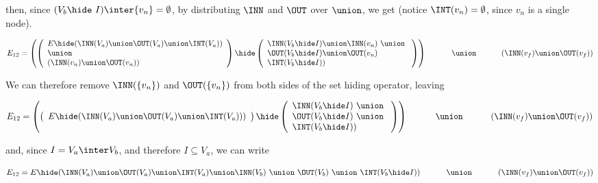 \noindent
then, since $(V_b\hide\ I) \inter \{v_{n}\} = \emptyset$, by distributing $\INN$ and $\OUT$  over $\union$, we get (notice $\INT(v_n) = \emptyset$, since $v_n$ is a single node).

\[
E_{12}  =  \left( \left(
\begin{array}{l}
  E\hide(\INN(V_a) \union \OUT(V_a) \union \INT(V_a)) \\  \union \\ (\INN(v_n) \union \OUT(v_n) ) \\
\end{array} \right)
   \hide
   \left( \begin{array}{l}
     \INN(V_b\hide I)\union \INN(v_n) ~\union\ \\
     \OUT(V_b\hide I)\union \OUT(v_n)  \\
     \INT(V_b\hide I)) 
   \end{array}
   \right) \right) \\
   \hphantom{E_{12}  = \;\; }   \union\ \\
\hphantom{E_{12}  = \;\;}   (\INN(v_f) \union \OUT(v_f))\\ 
\]

\noindent
We can therefore remove $\INN(\{v_n\})$ and $\OUT(\{v_n\})$ from both sides of the set hiding operator, leaving 

\[
E_{12}  =  \left( \left(
  \begin{array}{l}
  E\hide(\INN(V_a) \union \OUT(V_a) \union \INT(V_a)) ) \\
  \end{array} \right)
   \hide
   \left( \begin{array}{l}
     \INN(V_b\hide I) ~\union\ \\
     \OUT(V_b\hide I) ~\union\ \\
          \INT(V_b\hide I)) 
   \end{array}
   \right) \right) \\
   \hphantom{E_{12}  = \;\; }   \union\ \\
\hphantom{E_{12}  = \;\;}   (\INN(v_f) \union \OUT(v_f))\\ 
\]


\noindent
and, since $I = V_a \inter V_b$,  and therefore $I \subseteq V_a$, we can write

\[
E_{12}  = 
  E\hide(\INN(V_a) \union \OUT(V_a) \union \INT(V_a) \union    \INN(V_b) ~\union\ \OUT(V_b)   ~\union\   \INT(V_b\hide I))  \\
   \hphantom{E_{12}  = \;\; }   \union\ \\
\hphantom{E_{12}  = \;\;}   (\INN(v_f) \union \OUT(v_f))\\ 
\]





